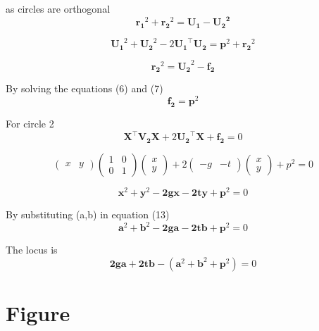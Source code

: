 \documentclass[journal,12pt,twocolumn]{IEEEtran}
\newcommand{\myvec}[1]{\ensuremath{\begin{pmatrix}#1\end{pmatrix}}}
\let\vec\mathbf
\begin{document}
as circles are orthogonal
\begin{equation}
    \vec{r_1}^2+\vec{r_2}^2=\vec{\vec{U_1-U_2}^2}
\end{equation}
   
\begin{equation}
    \vec{U_1}^2+\vec{U_2}^2-2\vec{U_1}^{\top}\vec{U_2}=\vec{p}^2+\vec{r_2}^2
\end{equation}

\begin{equation}
    \vec{r_2}^2=\vec{\vec{U_2}}^2-\vec{f_2}
\end{equation}

By solving the equations (6) and (7)
\begin{equation}
    \vec{f_2}=\vec{p}^2
\end{equation}
  
For circle 2 \\
\begin{equation}
    \vec{X}^{\top}\vec{V_2}\vec{X}+2\vec{U_2}^{\top}\vec{X}+\vec{f_2}=0
\end{equation}
    

\begin{equation}
    {\myvec{x & y}} 
    {\myvec{1 & 0 \\0 & 1}} 
    {\myvec{x \\ y}}+2
    {\myvec{-g & -t}} 
    {\myvec{x \\ y}}+p^2=0
\end{equation}

\begin{equation}
    \vec{x}^2+\vec{y}^2-\vec{2gx}-\vec{2ty}+\vec{p}^2=0
\end{equation}

By substituting (a,b) in equation (13) \\
\begin{equation}
    \vec{a}^2+\vec{b}^2-\vec{2ga}-\vec{2tb}+\vec{p}^2=0
\end{equation}

The locus is \\
\begin{equation}
    \vec{2ga}+\vec{2tb}-(\vec{a}^2+\vec{b}^2+\vec{p}^2)=0
\end{equation}


\section{\textbf{Figure}}
\end{document}

